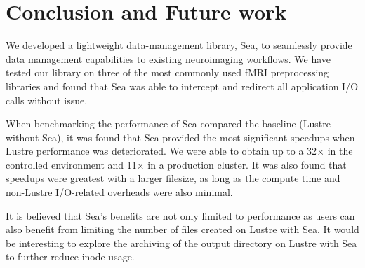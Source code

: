     
    
    
    \section{Conclusion and Future work}

    We developed a lightweight data-management library, Sea, to seamlessly
    provide data management capabilities to existing neuroimaging workflows.
    We have tested our library on three of the most commonly used fMRI preprocessing
    libraries and found that Sea was able to intercept and redirect all application I/O
    calls without issue. 

    When benchmarking the performance of Sea compared the baseline (Lustre without Sea),
    it was found that Sea provided the most significant speedups when Lustre performance was
    deteriorated. We were able to obtain up to a 32$\times$ in the controlled environment and 11$\times$
    in a production cluster. It was also found that speedups were greatest with a larger filesize, as long
    as the compute time and non-Lustre I/O-related overheads were also minimal.

    It is believed that Sea's benefits are not only limited to performance as users can
    also benefit from limiting the number of files created on Lustre with Sea. It would be
    interesting to explore the archiving of the output directory on Lustre with Sea to further
    reduce inode usage.